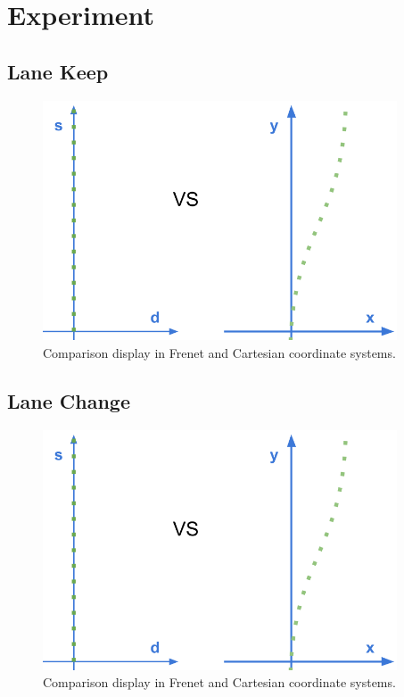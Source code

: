 \section{Experiment}

\subsection{Lane Keep}

\begin{figure}[h]
\centering
\includegraphics[height=2.8in]{figs/ch3/frenet-final}
\caption{Comparison display in Frenet and Cartesian coordinate systems.}
\label{fig:lane-keep}
\end{figure}

\subsection{Lane Change}

\begin{figure}[h]
\centering
\includegraphics[height=2.8in]{figs/ch3/frenet-final}
\caption{Comparison display in Frenet and Cartesian coordinate systems.}
\label{fig:lane-change}
\end{figure}

%
%

